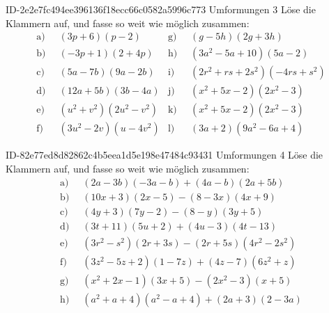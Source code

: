 \begin{exercise}
      {ID-2e2e7fc494ee396136f18ecc66c0582a5996c773}
      {Umformungen 3}
  \ifproblem\problem
    \newcommand{\gap}{\;\;}%
    Löse die Klammern auf, und fasse so weit wie möglich zusammen:
    \begin{align*}
      \text{a)}\gap & (3p+6)(p-2) &
      \text{g)}\gap & (g-5h)(2g+3h)
      \\
      \text{b)}\gap & (-3p+1)(2+4p) &
      \text{h)}\gap & (3a^2-5a+10)(5a-2)
      \\
      \text{c)}\gap & (5a-7b)(9a-2b) &
      \text{i)}\gap & (2r^2+rs+2s^2)(-4rs+s^2)
      \\
      \text{d)}\gap & (12a+5b)(3b-4a) &
      \text{j)}\gap & (x^2+5x-2)(2x^2-3)
      \\
      \text{e)}\gap & (u^2+v^2)(2u^2-v^2) &
      \text{k)}\gap & (x^2+5x-2)(2x^2-3)
      \\
      \text{f)}\gap & (3u^2-2v)(u-4v^2) &
      \text{l)}\gap & (3a+2)(9a^2-6a+4)
    \end{align*}
  \fi
\end{exercise}

\begin{exercise}
      {ID-82e77ed8d82862c4b5eea1d5e198e47484c93431}
      {Umformungen 4}
  \ifproblem\problem
    \newcommand{\gap}{\;\;}%
    Löse die Klammern auf, und fasse so weit wie möglich zusammen:
    \begin{equation*}
      \begin{split}
        \text{a)}\gap & (2a-3b)(-3a-b)+(4a-b)(2a+5b) \\
        \text{b)}\gap & (10x+3)(2x-5)-(8-3x)(4x+9) \\
        \text{c)}\gap & (4y+3)(7y-2)-(8-y)(3y+5) \\
        \text{d)}\gap & (3t+11)(5u+2)+(4u-3)(4t-13) \\
        \text{e)}\gap & (3r^2-s^2)(2r+3s)-(2r+5s)(4r^2-2s^2) \\
        \text{f)}\gap & (3z^2-5z+2)(1-7z)+(4z-7)(6z^2+z) \\
        \text{g)}\gap & (x^2+2x-1)(3x+5)-(2x^2-3)(x+5) \\
        \text{h)}\gap & (a^2+a+4)(a^2-a+4)+(2a+3)(2-3a)
      \end{split}
    \end{equation*}
  \fi
\end{exercise}

